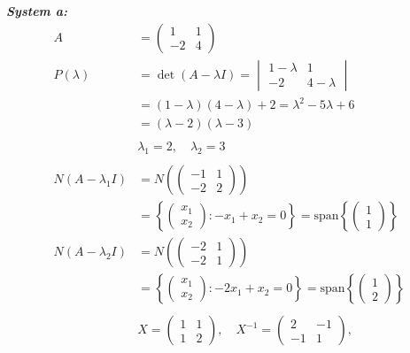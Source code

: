 \documentclass{article}
\begin{document}
\newpage
\noindent\textbf{\textit{System a:}}
\begin{align*}
    A &= \begin{pmatrix} 1 & 1 \\ -2 & 4 \end{pmatrix} \\
    P(\lambda) &= \det(A - \lambda I) = \begin{vmatrix} 1 - \lambda & 1 \\ -2 & 4 - \lambda \end{vmatrix} \\
    &= (1 - \lambda)(4 - \lambda) + 2 = \lambda^2 - 5\lambda + 6 \\
    &= (\lambda - 2)(\lambda - 3) \\
    \\
    &\lambda_1 = 2, \quad \lambda_2 = 3 \\
    \\
    N(A - \lambda_1 I) &= N\left(\begin{pmatrix} -1 & 1 \\ -2 & 2 \end{pmatrix}\right) \\
    &= \left\{ \begin{pmatrix} x_1 \\ x_2 \end{pmatrix} : -x_1 + x_2 = 0 \right\}
    = \text{span}\left\{ \begin{pmatrix} 1 \\ 1 \end{pmatrix} \right\} \\
    N(A - \lambda_2 I) &= N\left(\begin{pmatrix} -2 & 1 \\ -2 & 1 \end{pmatrix}\right) \\
    &= \left\{ \begin{pmatrix} x_1 \\ x_2 \end{pmatrix} : -2x_1 + x_2 = 0 \right\}
    = \text{span}\left\{ \begin{pmatrix} 1 \\ 2 \end{pmatrix} \right\} \\
    \\
    &X = \begin{pmatrix} 1 & 1 \\ 1 & 2 \end{pmatrix} , \quad
    X^{-1} = \begin{pmatrix} 2 & -1 \\ -1 & 1 \end{pmatrix} , \quad

\end{align*}
\end{document}
